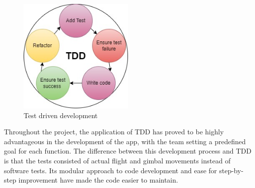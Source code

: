 \begin{figure}[H]
  \centering
  \includegraphics[width=0.5\textwidth]{figure/TDD.jpg}
  \caption{Test driven development}
  \label{fig:TDD}
\end{figure}

Throughout the project, the application of TDD has proved to be highly advantageous in the development of the app, with the team setting a predefined goal for each function. The difference between this development process and TDD is that the tests consisted of actual flight and gimbal movements instead of software tests. Its modular approach to code development and ease for step-by-step improvement have made the code easier to maintain. 

